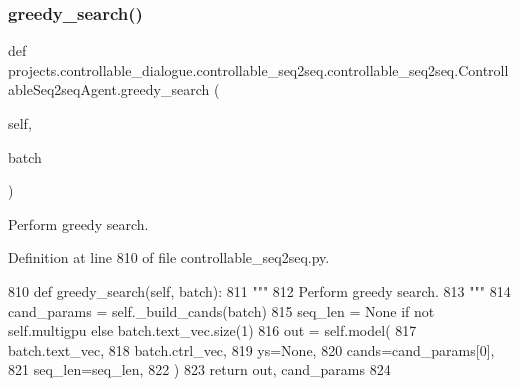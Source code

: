 \subsubsection{\texorpdfstring{greedy\+\_\+search()}{greedy\_search()}}
{\footnotesize\ttfamily def projects.\+controllable\+\_\+dialogue.\+controllable\+\_\+seq2seq.\+controllable\+\_\+seq2seq.\+Controllable\+Seq2seq\+Agent.\+greedy\+\_\+search (\begin{DoxyParamCaption}\item[{}]{self,  }\item[{}]{batch }\end{DoxyParamCaption})}

\begin{DoxyVerb}Perform greedy search.
\end{DoxyVerb}
 

Definition at line 810 of file controllable\+\_\+seq2seq.\+py.


\begin{DoxyCode}
810     \textcolor{keyword}{def }greedy\_search(self, batch):
811         \textcolor{stringliteral}{"""}
812 \textcolor{stringliteral}{        Perform greedy search.}
813 \textcolor{stringliteral}{        """}
814         cand\_params = self.\_build\_cands(batch)
815         seq\_len = \textcolor{keywordtype}{None} \textcolor{keywordflow}{if} \textcolor{keywordflow}{not} self.multigpu \textcolor{keywordflow}{else} batch.text\_vec.size(1)
816         out = self.model(
817             batch.text\_vec,
818             batch.ctrl\_vec,
819             ys=\textcolor{keywordtype}{None},
820             cands=cand\_params[0],
821             seq\_len=seq\_len,
822         )
823         \textcolor{keywordflow}{return} out, cand\_params
824 
\end{DoxyCode}
\mbox{\label{classprojects_1_1controllable__dialogue_1_1controllable__seq2seq_1_1controllable__seq2seq_1_1ControllableSeq2seqAgent_a938d6646b76eaf838ddcd54ee71aa5d9}} 
